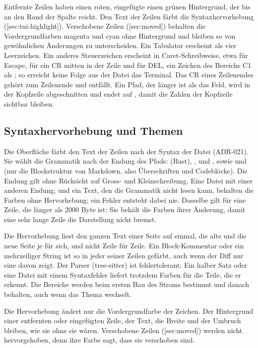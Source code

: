 Entfernte Zeilen haben einen roten, eingefügte einen grünen Hintergrund, der bis an den Rand der
Spalte reicht. Den Text der Zeilen färbt die Syntaxhervorhebung
([sec:tui-highlight]).
Verschobene Zeilen ([sec:moved]) behalten die Vordergrundfarben
magenta und cyan ohne Hintergrund und bleiben so von gewöhnlichen Änderungen zu unterscheiden.
Ein Tabulator erscheint als vier Leerzeichen. Ein anderes Steuerzeichen erscheint in
Caret-Schreibweise, etwa \type{^[} für Escape,  für ein CR mitten in der Zeile und
 für DEL, ein Zeichen des Bereichs C1 als ; so erreicht keine Folge aus der
Datei das Terminal. Das CR eines Zeilenendes \type{\r\n} gehört zum Zeilenende und entfällt.
Ein Pfad, der länger ist als das Feld, wird in der Kopfzeile abgeschnitten und endet auf
, damit die Zahlen der Kopfzeile sichtbar bleiben.

\subsection[sec:tui-highlight]{Syntaxhervorhebung und Themen}

Die Oberfläche färbt den Text der Zeilen nach der Syntax der Datei (ADR-021). Sie wählt die
Grammatik nach der Endung des Pfads:  (Rust), ,  und ,
 sowie  und  (nur die Blockstruktur von Markdown, also
Überschriften und Codeblöcke).
Die Endung gilt ohne Rücksicht auf Gross- und Kleinschreibung.
Eine Datei mit einer anderen Endung, und ein Text, den die Grammatik nicht lesen kann, behalten
die Farben ohne Hervorhebung; ein Fehler entsteht dabei nie.
Dasselbe gilt für eine Zeile, die länger als 2000 Byte ist: Sie behält die Farben ihrer
Änderung, damit eine sehr lange Zeile die Darstellung nicht bremst.

Die Hervorhebung liest den ganzen Text einer Seite auf einmal, die alte und die neue Seite je
für sich, und nicht Zeile für Zeile. Ein Block-Kommentar oder ein mehrzeiliger String ist so in
jeder seiner Zeilen gefärbt, auch wenn der Diff nur eine davon zeigt. Der Parser (tree-sitter)
ist fehlertolerant: Ein halber Satz oder eine Datei mit einem Syntaxfehler liefert trotzdem
Farben für die Teile, die er erkennt. Die Bereiche werden beim ersten Bau des Stroms bestimmt und
danach behalten, auch wenn das Thema wechselt.

Die Hervorhebung ändert nur die Vordergrundfarbe der Zeichen. Der Hintergrund einer entfernten
oder eingefügten Zeile, der Text, die Breite und der Umbruch bleiben, wie sie ohne sie wären.
Verschobene Zeilen ([sec:moved]) werden nicht hervorgehoben, denn ihre Farbe
sagt, dass sie verschoben sind.

